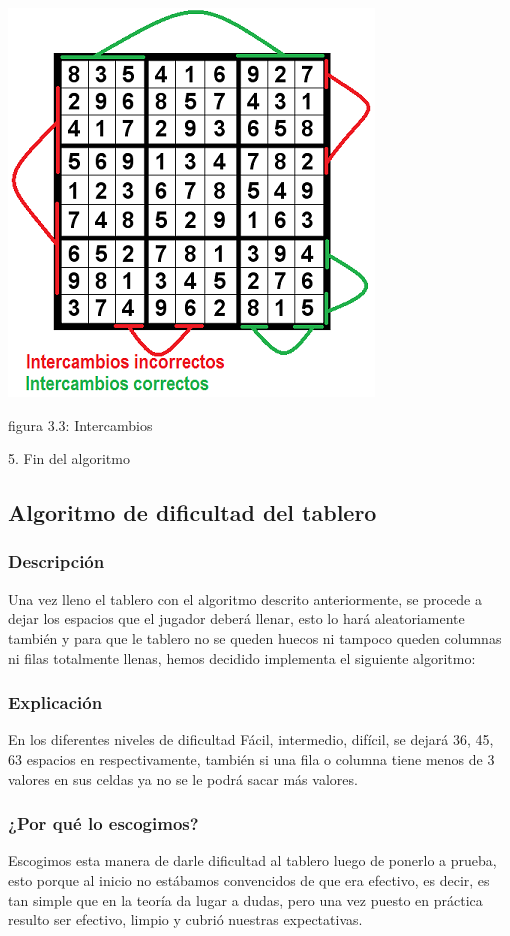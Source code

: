 \documentclass[a4paper,11pt]{article}
\begin{document}
\centerline{\includegraphics{sudoRe.png}}
\centerline{figura 3.3: Intercambios}

5.	Fin del algoritmo

\subsection{Algoritmo de dificultad del tablero}
\subsubsection{Descripción}
	Una vez lleno el tablero con el algoritmo descrito anteriormente, se procede a dejar los espacios que el jugador deberá llenar, esto lo hará aleatoriamente también y para que le tablero no se queden huecos ni tampoco queden columnas ni filas totalmente llenas, hemos decidido implementa el siguiente algoritmo:
\subsubsection{Explicación}
En los diferentes niveles de dificultad Fácil, intermedio, difícil, se dejará 36, 45, 63 espacios en respectivamente, también si una fila o columna tiene menos de 3 valores en sus celdas ya no se le podrá sacar más valores.
\subsubsection{¿Por qué lo escogimos?}
	Escogimos esta manera de darle dificultad al tablero luego de ponerlo a prueba, esto porque al inicio no estábamos convencidos de que era efectivo, es decir, es tan simple que en la teoría da lugar a dudas, pero una vez puesto en práctica resulto ser efectivo, limpio y cubrió nuestras expectativas.
\end{document}
